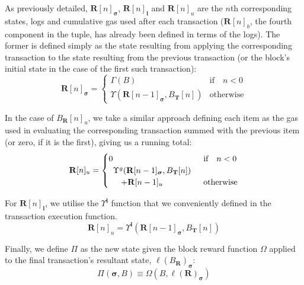 \documentclass[9pt,oneside]{amsart}
\begin{document}
\begin{multicols}{2}
As previously detailed, $\mathbf{R}[n]_{\boldsymbol{\sigma}}$, $\mathbf{R}[n]_\mathbf{l}$ and $\mathbf{R}[n]_u$ are the $n$th corresponding states, logs and cumulative gas used after each transaction ($\mathbf{R}[n]_b$, the fourth component in the tuple, has already been defined in terms of the logs). The former is defined simply as the state resulting from applying the corresponding transaction to the state resulting from the previous transaction (or the block's initial state in the case of the first such transaction):
\begin{equation}
\mathbf{R}[n]_{\boldsymbol{\sigma}} = \begin{cases} \Gamma(B) & \text{if} \quad n < 0 \\ \Upsilon(\mathbf{R}[n - 1]_{\boldsymbol{\sigma}}, B_\mathbf{T}[n]) & \text{otherwise} \end{cases}
\end{equation}

In the case of $B_\mathbf{R}[n]_u$, we take a similar approach defining each item as the gas used in evaluating the corresponding transaction summed with the previous item (or zero, if it is the first), giving us a running total:
\begin{equation}
\mathbf{R}[n]_u = \begin{cases} 0 & \text{if} \quad n < 0 \\
\begin{array}[b]{l}
\Upsilon^g(\mathbf{R}[n - 1]_{\boldsymbol{\sigma}}, B_\mathbf{T}[n])\\ \quad + \mathbf{R}[n-1]_u
\end{array}
 & \text{otherwise} \end{cases}
\end{equation}

For $\mathbf{R}[n]_\mathbf{l}$, we utilise the $\Upsilon^\mathbf{l}$ function that we conveniently defined in the transaction execution function.
\begin{equation}
\mathbf{R}[n]_u = 
\Upsilon^\mathbf{l}(\mathbf{R}[n - 1]_{\boldsymbol{\sigma}}, B_\mathbf{T}[n])
\end{equation}

Finally, we define $\Pi$ as the new state given the block reward function $\Omega$ applied to the final transaction's resultant state, $\ell(B_\mathbf{R})_{\boldsymbol{\sigma}}$:
\begin{equation}
\Pi(\boldsymbol{\sigma}, B) \equiv \Omega(B, \ell(\mathbf{R})_{\boldsymbol{\sigma}})
\end{equation}


\end{multicols}
\end{document}
